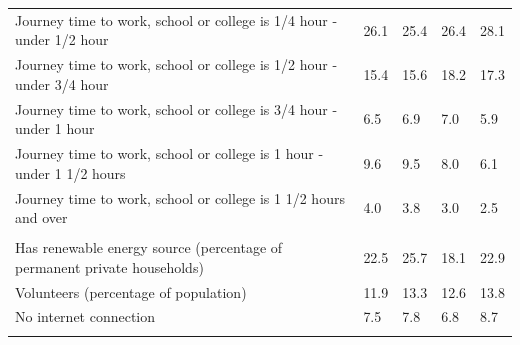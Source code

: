 \documentclass{article}
\begin{document}
\begin{table}[h]
\begin{tabular}{KTTTT}
Journey time to work, school or college is 1/4 hour - under 1/2 hour & 26.1& 25.4& 26.4& 28.1\\
Journey time to work, school or college is 1/2 hour - under 3/4 hour & 15.4& 15.6& 18.2& 17.3\\
Journey time to work, school or college is 3/4 hour - under 1 hour & 6.5& 6.9& 7.0& 5.9\\
Journey time to work, school or college is 1 hour - under 1 1/2 hours & 9.6& 9.5& 8.0& 6.1\\
Journey time to work, school or college is 1 1/2 hours and over & 4.0& 3.8& 3.0& 2.5\\
\hline
    \\ 
    \hline
Has renewable energy source (percentage of permanent private households) & 22.5& 25.7& 18.1& 22.9\\
    \hline
Volunteers (percentage of population) & 11.9& 13.3& 12.6& 13.8\\
    \hline
No internet connection& 7.5& 7.8& 6.8& 8.7\\
\hline
\end{tabular}
\end{table}
\end{document}
